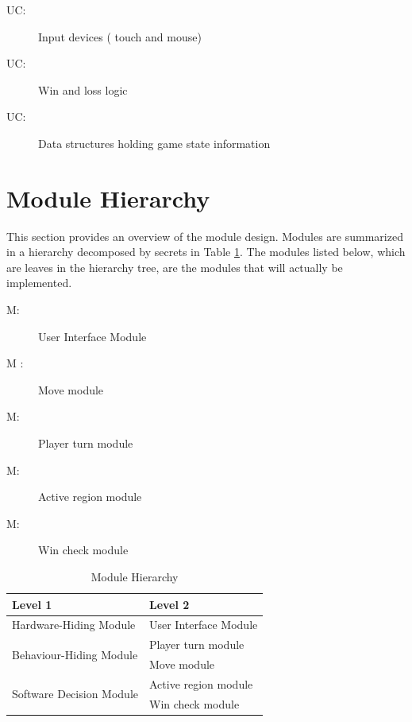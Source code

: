 \documentclass[12pt, titlepage]{article}
\newcounter{ucnum}
\newcommand{\uctheucnum}{UC\theucnum}
\newcounter{mnum}
\newcommand{\mthemnum}{M\themnum}
\begin{document}
\begin{description}
\item[ \uctheucnum \label{uc1}:] Input devices ( touch and mouse)
\item[ \uctheucnum \label{uc2}:] Win and loss logic
\item[ \uctheucnum \label{uc3}:] Data structures holding game state information
\end{description}

\section{Module Hierarchy} \label{SecMH}

This section provides an overview of the module design. Modules are summarized
in a hierarchy decomposed by secrets in Table \ref{TblMH}. The modules listed
below, which are leaves in the hierarchy tree, are the modules that will
actually be implemented.

\begin{description}
\item [ \mthemnum \label{m1}:] User Interface Module
\item [ \mthemnum \label{m2} :] Move module
\item [ \mthemnum \label{m3}:] Player turn module
\item [ \mthemnum \label{m4}:] Active region module
\item [ \mthemnum \label{m5}:] Win check module
\end{description}


\begin{table}[h!]
\centering
\begin{tabular}{p{} p{}}
\toprule
\textbf{Level 1} & \textbf{Level 2}\\
\midrule

{Hardware-Hiding Module} & User Interface Module \\
\midrule

\multirow{2}{0.3\textwidth}{Behaviour-Hiding Module} & Player turn module\\
& Move module\\
\midrule

\multirow{2}{0.3\textwidth}{Software Decision Module} & {Active region module}\\
& Win check module\\
\bottomrule

\end{tabular}
\caption{Module Hierarchy}
\label{TblMH}
\end{table}
\end{document}
